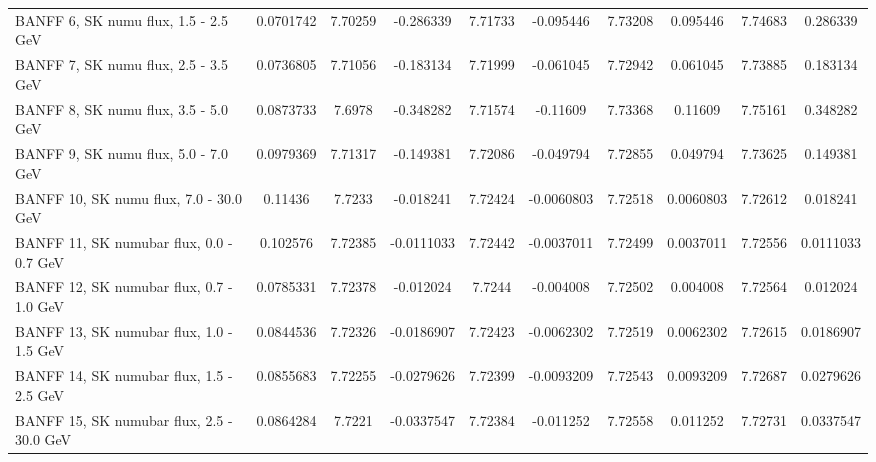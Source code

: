 \begin{tabular}{| l | S | S  S | S  S | S  S | S  S | }
                                           BANFF  6, SK numu flux, 1.5 - 2.5 GeV &       0.0701742 &         7.70259 &       -0.286339 &         7.71733 &       -0.095446 &         7.73208 &        0.095446 &         7.74683 &        0.286339 \\ 
                                           BANFF  7, SK numu flux, 2.5 - 3.5 GeV &       0.0736805 &         7.71056 &       -0.183134 &         7.71999 &       -0.061045 &         7.72942 &        0.061045 &         7.73885 &        0.183134 \\ 
                                           BANFF  8, SK numu flux, 3.5 - 5.0 GeV &       0.0873733 &          7.6978 &       -0.348282 &         7.71574 &        -0.11609 &         7.73368 &         0.11609 &         7.75161 &        0.348282 \\ 
                                           BANFF  9, SK numu flux, 5.0 - 7.0 GeV &       0.0979369 &         7.71317 &       -0.149381 &         7.72086 &       -0.049794 &         7.72855 &        0.049794 &         7.73625 &        0.149381 \\ 
                                          BANFF 10, SK numu flux, 7.0 - 30.0 GeV &         0.11436 &          7.7233 &       -0.018241 &         7.72424 &      -0.0060803 &         7.72518 &       0.0060803 &         7.72612 &        0.018241 \\ 
                                        BANFF 11, SK numubar flux, 0.0 - 0.7 GeV &        0.102576 &         7.72385 &      -0.0111033 &         7.72442 &      -0.0037011 &         7.72499 &       0.0037011 &         7.72556 &       0.0111033 \\ 
                                        BANFF 12, SK numubar flux, 0.7 - 1.0 GeV &       0.0785331 &         7.72378 &       -0.012024 &          7.7244 &       -0.004008 &         7.72502 &        0.004008 &         7.72564 &        0.012024 \\ 
                                        BANFF 13, SK numubar flux, 1.0 - 1.5 GeV &       0.0844536 &         7.72326 &      -0.0186907 &         7.72423 &      -0.0062302 &         7.72519 &       0.0062302 &         7.72615 &       0.0186907 \\ 
                                        BANFF 14, SK numubar flux, 1.5 - 2.5 GeV &       0.0855683 &         7.72255 &      -0.0279626 &         7.72399 &      -0.0093209 &         7.72543 &       0.0093209 &         7.72687 &       0.0279626 \\ 
                                       BANFF 15, SK numubar flux, 2.5 - 30.0 GeV &       0.0864284 &          7.7221 &      -0.0337547 &         7.72384 &       -0.011252 &         7.72558 &        0.011252 &         7.72731 &       0.0337547 \\ 

\end{tabular}
